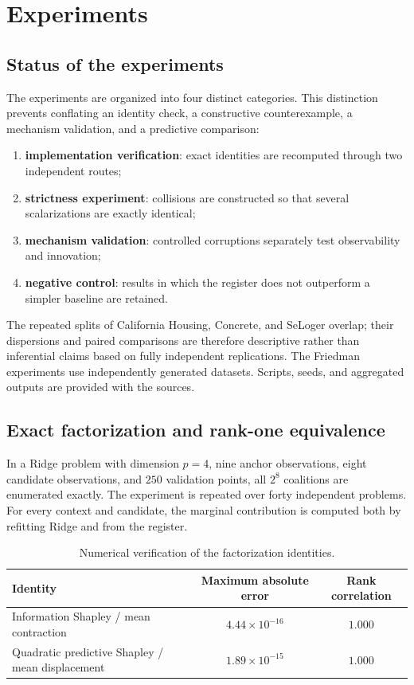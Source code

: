 \section{Experiments}
\label{sec:experiments}
\subsection{Status of the experiments}
The experiments are organized into four distinct categories. This distinction prevents conflating an identity check, a constructive counterexample, a mechanism validation, and a predictive comparison:
\begin{enumerate}
  \item \textbf{implementation verification}: exact identities are recomputed through two independent routes;
  \item \textbf{strictness experiment}: collisions are constructed so that several scalarizations are exactly identical;
  \item \textbf{mechanism validation}: controlled corruptions separately test observability and innovation;
  \item \textbf{negative control}: results in which the register does not outperform a simpler baseline are retained.
\end{enumerate}
The repeated splits of California Housing, Concrete, and SeLoger overlap; their dispersions and paired comparisons are therefore descriptive rather than inferential claims based on fully independent replications. The Friedman experiments use independently generated datasets. Scripts, seeds, and aggregated outputs are provided with the sources.

\subsection{Exact factorization and rank-one equivalence}
\label{subsec:experiments-factorization}
In a Ridge problem with dimension $p=4$, nine anchor observations, eight candidate observations, and $250$ validation points, all $2^8$ coalitions are enumerated exactly. The experiment is repeated over forty independent problems. For every context and candidate, the marginal contribution is computed both by refitting Ridge and from the register.

\begin{table}[H]
\centering
\caption{Numerical verification of the factorization identities.}
\label{tab:exact-factorization}
\small
\begin{tabular}{@{}lcc@{}}
\toprule
Identity & Maximum absolute error & Rank correlation \\
\midrule
Information Shapley / mean contraction & $4.44\times10^{-16}$ & $1.000$ \\
Quadratic predictive Shapley / mean displacement & $1.89\times10^{-15}$ & $1.000$ \\
\bottomrule
\end{tabular}
\end{table}

